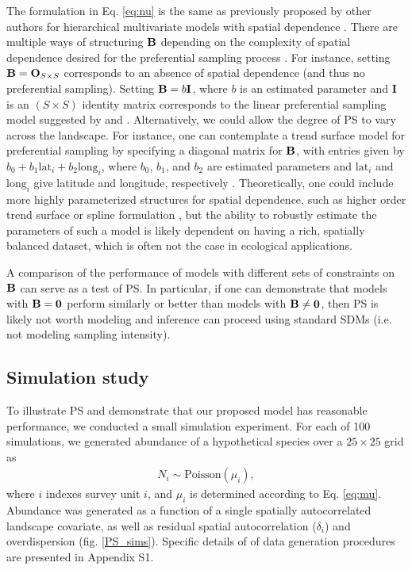 \documentclass[times,mee,doublespace,]{besauth2}
\begin{document}
 The formulation in Eq. \ref{eq:nu} is the same as previously proposed by other authors for hierarchical multivariate models with spatial dependence \citep[cf.][]{RoyleBerliner1999}.  There are multiple ways of structuring ${\bf B}$ depending on the complexity of spatial dependence desired for the preferential sampling process \citep{RoyleBerliner1999}.  For instance, setting ${\bf B} = {\bf O}_{S \times S}$ corresponds to an absence of spatial dependence (and thus no preferential sampling).  Setting ${\bf B} = b {\bf I}$, where $b$ is an estimated parameter and {\bf I} is an $(S \times S)$ identity matrix corresponds to the linear preferential sampling model suggested by \citet{DiggleEtAl2010} and \citet{PatiEtAl2011}.  Alternatively, we could allow the degree of PS to vary across the landscape.  For instance, one can contemplate a trend surface model for preferential sampling by specifying a diagonal matrix for ${\bf B}$, with entries given by $b_0 + b_1 \textrm{lat}_i + b_2 \textrm{long}_i$, where $b_0$, $b_1$, and $b_2$ are estimated parameters and $\textrm{lat}_i$ and $\textrm{long}_i$ give latitude and longitude, respectively \citep{RoyleBerliner1999}.  Theoretically, one could include more highly parameterized structures for spatial dependence, such as higher order trend surface or spline formulation \citep{RoyleBerliner1999}, but the ability to robustly estimate the parameters of such a model is likely dependent on having a rich, spatially balanced dataset, which is often not the case in ecological applications.

A comparison of the performance of models with different sets of constraints on ${\bf B}$ can serve as a test of PS.  In particular, if one can demonstrate that models with ${\bf B}={\bf 0}$ perform similarly or better than models with ${\bf B} \ne {\bf 0}$, then PS is likely not worth modeling and inference can proceed using standard SDMs (i.e. not modeling sampling intensity).


\subsection{Simulation study}

To illustrate PS and demonstrate that our proposed model has reasonable performance, we conducted a small simulation experiment.  For each of 100 simulations, we generated abundance of a hypothetical species over a $25 \times 25$ grid as
\begin{eqnarray*}
  N_i \sim \textrm{Poisson}(\mu_i),
\end{eqnarray*}
where $i$ indexes survey unit $i$, and $\mu_i$ is determined according to Eq. \ref{eq:mu}. Abundance was generated as a function of a single spatially autocorrelated landscape covariate, as well as residual spatial autocorrelation ($\delta_i$) and overdispersion (fig. \ref{PS_sims}). Specific details of of data generation procedures are presented in Appendix S1.
\end{document}
